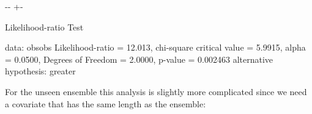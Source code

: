 \documentclass[letterpaper,10pt,english]{sphinxmanual}
\newlength\nbsphinxcodecellspacing
\begin{document}
{

\kern-\sphinxverbatimsmallskipamount\kern-\baselineskip
\kern+\FrameHeightAdjust\kern-\fboxrule
\vspace{\nbsphinxcodecellspacing}

\begin{sphinxVerbatim}[commandchars=\\\{\}]

        Likelihood-ratio Test

data:  obsobs
Likelihood-ratio = 12.013, chi-square critical value = 5.9915, alpha =
0.0500, Degrees of Freedom = 2.0000, p-value = 0.002463
alternative hypothesis: greater

\end{sphinxVerbatim}
}

For the unseen ensemble this analysis is slightly more complicated since we need a covariate that has the same length as the ensemble:
\end{document}
